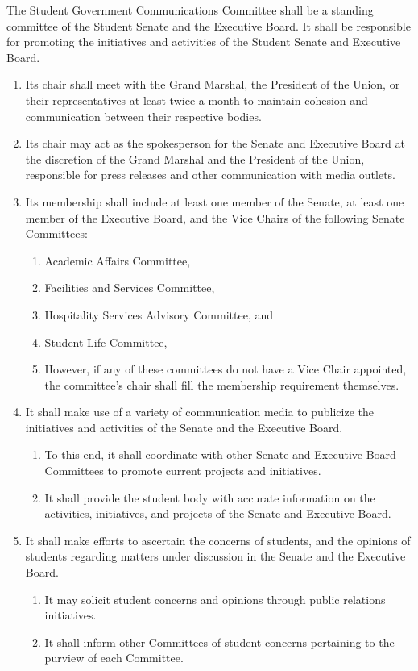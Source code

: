 \item The Student Government Communications Committee shall be a standing committee of the Student Senate and the Executive
Board. It shall be responsible for promoting the initiatives and activities of the Student Senate and Executive Board.
\begin{enumerate}
\item Its chair shall meet with the Grand Marshal, the President of the Union, or their representatives at least twice a month to maintain cohesion and communication between their respective bodies.
\item Its chair may act as the spokesperson for the Senate and Executive Board at the discretion of the Grand Marshal and the President of the Union, responsible for press releases and other communication with media outlets.
\item Its membership shall include at least one member of the Senate, at least one member of the Executive Board, and the Vice
Chairs of the following Senate Committees:
\begin{enumerate}
\item Academic Affairs Committee,
\item Facilities and Services Committee,
\item Hospitality Services Advisory Committee, and
\item Student Life Committee,
\item However, if any of these committees do not have a Vice Chair appointed, the committee's chair shall fill the membership requirement themselves.
\end{enumerate}
\item It shall make use of a variety of communication media to publicize the initiatives and activities of the Senate and the
Executive Board.
\begin{enumerate}
\item To this end, it shall coordinate with other Senate and Executive Board Committees to promote current projects and initiatives.
\item It shall provide the student body with accurate information on the activities, initiatives, and projects of the Senate and Executive Board.
\end{enumerate}
\item It shall make efforts to ascertain the concerns of students, and the opinions of students regarding matters under discussion
in the Senate and the Executive Board.
\begin{enumerate}
\item It may solicit student concerns and opinions through public relations initiatives.
\item It shall inform other Committees of student concerns pertaining to the purview of each Committee.
\end{enumerate}


\end{enumerate}
